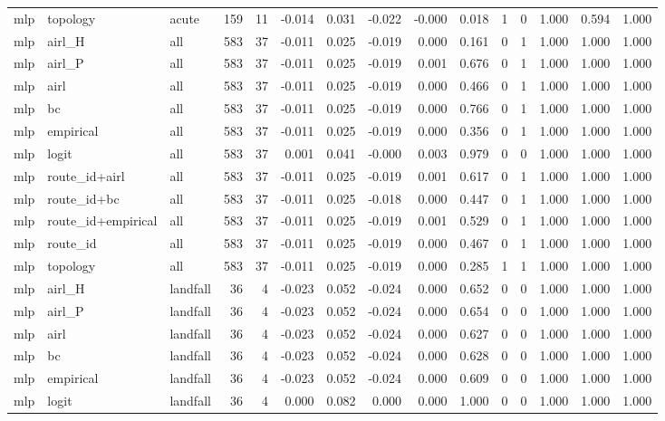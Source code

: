 \begin{tabular}{lllrrrrrrrrrrrr}
mlp & topology & acute & 159 & 11 & -0.014 & 0.031 & -0.022 & -0.000 & 0.018 & 1 & 0 & 1.000 & 0.594 & 1.000 \\
mlp & airl_H & all & 583 & 37 & -0.011 & 0.025 & -0.019 & 0.000 & 0.161 & 0 & 1 & 1.000 & 1.000 & 1.000 \\
mlp & airl_P & all & 583 & 37 & -0.011 & 0.025 & -0.019 & 0.001 & 0.676 & 0 & 1 & 1.000 & 1.000 & 1.000 \\
mlp & airl & all & 583 & 37 & -0.011 & 0.025 & -0.019 & 0.000 & 0.466 & 0 & 1 & 1.000 & 1.000 & 1.000 \\
mlp & bc & all & 583 & 37 & -0.011 & 0.025 & -0.019 & 0.000 & 0.766 & 0 & 1 & 1.000 & 1.000 & 1.000 \\
mlp & empirical & all & 583 & 37 & -0.011 & 0.025 & -0.019 & 0.000 & 0.356 & 0 & 1 & 1.000 & 1.000 & 1.000 \\
mlp & logit & all & 583 & 37 & 0.001 & 0.041 & -0.000 & 0.003 & 0.979 & 0 & 0 & 1.000 & 1.000 & 1.000 \\
mlp & route_id+airl & all & 583 & 37 & -0.011 & 0.025 & -0.019 & 0.001 & 0.617 & 0 & 1 & 1.000 & 1.000 & 1.000 \\
mlp & route_id+bc & all & 583 & 37 & -0.011 & 0.025 & -0.018 & 0.000 & 0.447 & 0 & 1 & 1.000 & 1.000 & 1.000 \\
mlp & route_id+empirical & all & 583 & 37 & -0.011 & 0.025 & -0.019 & 0.001 & 0.529 & 0 & 1 & 1.000 & 1.000 & 1.000 \\
mlp & route_id & all & 583 & 37 & -0.011 & 0.025 & -0.019 & 0.000 & 0.467 & 0 & 1 & 1.000 & 1.000 & 1.000 \\
mlp & topology & all & 583 & 37 & -0.011 & 0.025 & -0.019 & 0.000 & 0.285 & 1 & 1 & 1.000 & 1.000 & 1.000 \\
mlp & airl_H & landfall & 36 & 4 & -0.023 & 0.052 & -0.024 & 0.000 & 0.652 & 0 & 0 & 1.000 & 1.000 & 1.000 \\
mlp & airl_P & landfall & 36 & 4 & -0.023 & 0.052 & -0.024 & 0.000 & 0.654 & 0 & 0 & 1.000 & 1.000 & 1.000 \\
mlp & airl & landfall & 36 & 4 & -0.023 & 0.052 & -0.024 & 0.000 & 0.627 & 0 & 0 & 1.000 & 1.000 & 1.000 \\
mlp & bc & landfall & 36 & 4 & -0.023 & 0.052 & -0.024 & 0.000 & 0.628 & 0 & 0 & 1.000 & 1.000 & 1.000 \\
mlp & empirical & landfall & 36 & 4 & -0.023 & 0.052 & -0.024 & 0.000 & 0.609 & 0 & 0 & 1.000 & 1.000 & 1.000 \\
mlp & logit & landfall & 36 & 4 & 0.000 & 0.082 & 0.000 & 0.000 & 1.000 & 0 & 0 & 1.000 & 1.000 & 1.000 \\

\end{tabular}
